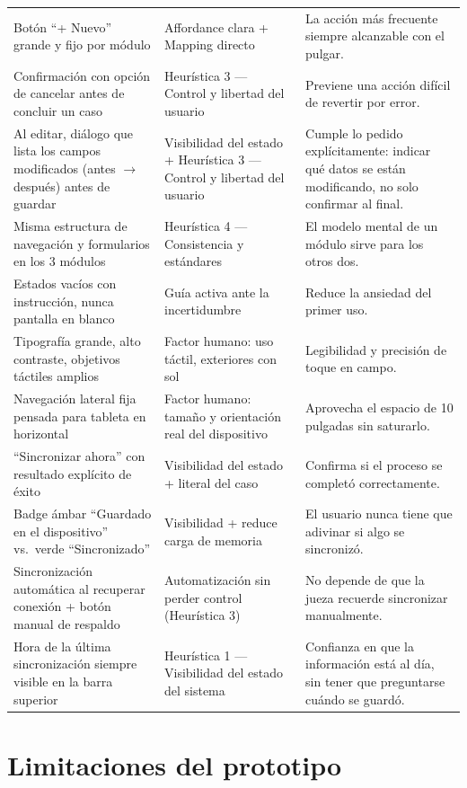 \documentclass[11pt,a4paper]{article}
\begin{document}
{\begin{longtable}{@{}p{5cm}p{4.3cm}p{6.2cm}@{}}
Botón \enquote{+ Nuevo} grande y fijo por módulo & Affordance clara + Mapping directo & La acción más frecuente siempre alcanzable con el pulgar. \\
Confirmación con opción de cancelar antes de concluir un caso & Heurística 3 --- Control y libertad del usuario & Previene una acción difícil de revertir por error. \\
Al editar, diálogo que lista los campos modificados (antes $\rightarrow$ después) antes de guardar & Visibilidad del estado + Heurística 3 --- Control y libertad del usuario & Cumple lo pedido explícitamente: indicar qué datos se están modificando, no solo confirmar al final. \\
Misma estructura de navegación y formularios en los 3 módulos & Heurística 4 --- Consistencia y estándares & El modelo mental de un módulo sirve para los otros dos. \\
Estados vacíos con instrucción, nunca pantalla en blanco & Guía activa ante la incertidumbre & Reduce la ansiedad del primer uso. \\
Tipografía grande, alto contraste, objetivos táctiles amplios & Factor humano: uso táctil, exteriores con sol & Legibilidad y precisión de toque en campo. \\
Navegación lateral fija pensada para tableta en horizontal & Factor humano: tamaño y orientación real del dispositivo & Aprovecha el espacio de 10 pulgadas sin saturarlo. \\
\enquote{Sincronizar ahora} con resultado explícito de éxito & Visibilidad del estado + literal del caso & Confirma si el proceso se completó correctamente. \\
Badge ámbar \enquote{Guardado en el dispositivo} vs.\ verde \enquote{Sincronizado} & Visibilidad + reduce carga de memoria & El usuario nunca tiene que adivinar si algo se sincronizó. \\
Sincronización automática al recuperar conexión + botón manual de respaldo & Automatización sin perder control (Heurística 3) & No depende de que la jueza recuerde sincronizar manualmente. \\
Hora de la última sincronización siempre visible en la barra superior & Heurística 1 --- Visibilidad del estado del sistema & Confianza en que la información está al día, sin tener que preguntarse cuándo se guardó. \\
\end{longtable}
}

\FloatBarrier
\section{Limitaciones del prototipo}
\end{document}
